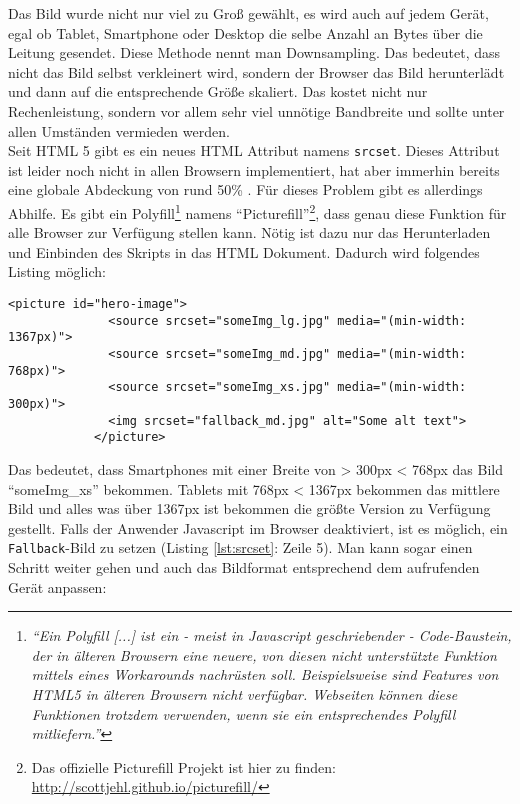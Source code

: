 			Das Bild wurde nicht nur viel zu Groß gewählt, es wird auch auf jedem Gerät, egal ob Tablet, Smartphone oder Desktop die selbe Anzahl an Bytes über die Leitung gesendet. Diese Methode nennt man Downsampling. Das bedeutet, dass nicht das Bild selbst verkleinert wird, sondern der Browser das Bild herunterlädt und dann auf die entsprechende Größe skaliert. Das kostet nicht nur Rechenleistung, sondern vor allem sehr viel unnötige Bandbreite und sollte unter allen Umständen vermieden werden.\\

			Seit HTML 5 gibt es ein neues HTML Attribut namens \texttt{srcset}. Dieses Attribut ist leider noch nicht in allen Browsern implementiert, hat aber immerhin bereits eine globale Abdeckung von rund 50\% \autocite{canIuse}. Für dieses Problem gibt es allerdings Abhilfe. Es gibt ein Polyfill\footnote{\textit{"`Ein Polyfill [...] ist ein - meist in Javascript geschriebender - Code-Baustein, der in älteren Browsern eine neuere, von diesen nicht unterstützte Funktion mittels eines Workarounds nachrüsten soll. Beispielsweise sind Features von HTML5 in älteren Browsern nicht verfügbar. Webseiten können diese Funktionen trotzdem verwenden, wenn sie ein entsprechendes Polyfill mitliefern."'}\autocite{wikipediaPolyfill}} namens "`Picturefill"'\footnote{Das offizielle Picturefill Projekt ist hier zu finden: \url{http://scottjehl.github.io/picturefill/}}, dass genau diese Funktion für alle Browser zur Verfügung stellen kann. Nötig ist dazu nur das Herunterladen und Einbinden des Skripts in das HTML Dokument. Dadurch wird folgendes Listing möglich: 

			\begin{lstlisting}[captionpos=b, caption=Srcset in Verwendung, label=lst:srcset]
			<picture id="hero-image">
			  <source srcset="someImg_lg.jpg" media="(min-width: 1367px)">
			  <source srcset="someImg_md.jpg" media="(min-width: 768px)">
			  <source srcset="someImg_xs.jpg" media="(min-width: 300px)">
			  <img srcset="fallback_md.jpg" alt="Some alt text">
			</picture>
			\end{lstlisting}

			Das bedeutet, dass Smartphones mit einer Breite von > 300px < 768px das Bild "`someImg\_xs"' bekommen. Tablets mit 768px < 1367px bekommen das mittlere Bild und alles was über 1367px ist bekommen die größte Version zu Verfügung gestellt. Falls der Anwender Javascript im Browser deaktiviert, ist es möglich, ein \texttt{Fallback}-Bild zu setzen (Listing \ref{lst:srcset}: Zeile 5). Man kann sogar einen Schritt weiter gehen und auch das Bildformat entsprechend dem aufrufenden Gerät anpassen:

